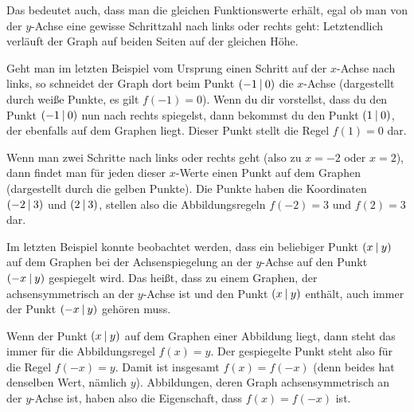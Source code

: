 \documentclass[../../main.tex]{subfiles}
\begin{document}
Das bedeutet auch, dass man die gleichen Funktionswerte erhält, egal ob man von der $y$-Achse eine gewisse Schrittzahl nach links oder rechts geht: Letztendlich verläuft der Graph auf beiden Seiten auf der gleichen Höhe.

\begin{example}
    Geht man im letzten Beispiel vom Ursprung einen Schritt auf der $x$-Achse nach links, so schneidet der Graph dort beim Punkt $\left(-1 \:\middle|\: 0\right)$ die $x$-Achse (dargestellt durch weiße Punkte, es gilt $f(-1)=0$). Wenn du dir vorstellst, dass du den Punkt $\left(-1 \:\middle|\: 0\right)$ nun nach rechts spiegelst, dann bekommst du den Punkt $\left(1 \:\middle|\: 0\right)$, der ebenfalls auf dem Graphen liegt. Dieser Punkt stellt die Regel $f(1)=0$ dar.
    
    Wenn man zwei Schritte nach links oder rechts geht (also zu $x=-2$ oder $x=2$), dann findet man für jeden dieser $x$-Werte einen Punkt auf dem Graphen (dargestellt durch die gelben Punkte). Die Punkte haben die Koordinaten $\left(-2 \:\middle|\: 3\right)$ und $\left(2 \:\middle|\: 3\right)$, stellen also die Abbildungsregeln $f(-2)=3$ und $f(2)=3$ dar.
\end{example}

Im letzten Beispiel konnte beobachtet werden, dass ein beliebiger Punkt $\left(x \:\middle|\: y\right)$ auf dem Graphen bei der Achsenspiegelung an der $y$-Achse auf den Punkt $\left(-x \:\middle|\: y\right)$ gespiegelt wird. Das heißt, dass zu einem Graphen, der achsensymmetrisch an der $y$-Achse ist und den Punkt $\left(x \:\middle|\: y\right)$ enthält, auch immer der Punkt $\left(-x \:\middle|\: y\right)$ gehören muss.

Wenn der Punkt $\left(x \:\middle|\: y\right)$ auf dem Graphen einer Abbildung liegt, dann steht das immer für die Abbildungsregel $f(x)=y$. Der gespiegelte Punkt steht also für die Regel $f(-x)=y$. Damit ist insgesamt $f(x)=f(-x)$ (denn beides hat denselben Wert, nämlich $y$). Abbildungen, deren Graph achsensymmetrisch an der $y$-Achse ist, haben also die Eigenschaft, dass $f(x)=f(-x)$ ist.
\end{document}

